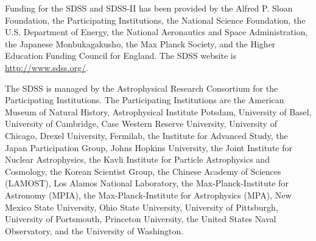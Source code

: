 \documentclass[useAMS,usenatbib]{mn2e}
\begin{document}
Funding for the SDSS and SDSS-II has been provided by the Alfred P. Sloan Foundation, the Participating Institutions, the National Science Foundation, the U.S. Department of Energy, the National Aeronautics and Space Administration, the Japanese Monbukagakusho, the Max Planck Society, and the Higher Education Funding Council for England. The SDSS website is \url{http://www.sdss.org/}.

The SDSS is managed by the Astrophysical Research Consortium for the Participating Institutions. The Participating Institutions are the American Museum of Natural History, Astrophysical Institute Potsdam, University of Basel, University of Cambridge, Case Western Reserve University, University of Chicago, Drexel University, Fermilab, the Institute for Advanced Study, the Japan Participation Group, Johns Hopkins University, the Joint Institute for Nuclear Astrophysics, the Kavli Institute for Particle Astrophysics and Cosmology, the Korean Scientist Group, the Chinese Academy of Sciences (LAMOST), Los Alamos National Laboratory, the Max-Planck-Institute for Astronomy (MPIA), the Max-Planck-Institute for Astrophysics (MPA), New Mexico State University, Ohio State University, University of Pittsburgh, University of Portsmouth, Princeton University, the United States Naval Observatory, and the University of Washington.





\bsp
\end{document}
